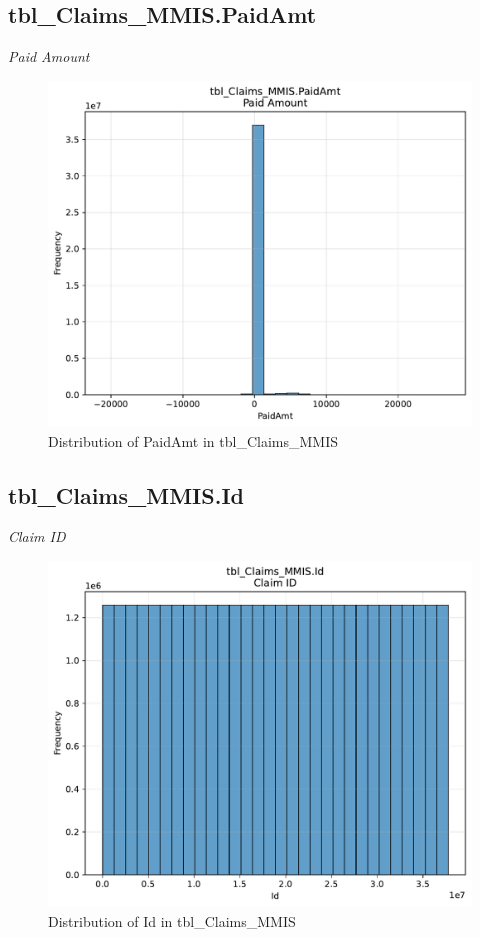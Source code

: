 \subsection{tbl\_Claims\_MMIS.PaidAmt}
\textit{Paid Amount}

\begin{figure}[htbp]
\centering
\includegraphics[width=\textwidth]{figures/dbo_tbl_Claims_MMIS_PaidAmt.pdf}
\caption{Distribution of PaidAmt in tbl\_Claims\_MMIS}
\end{figure}\newpage

\subsection{tbl\_Claims\_MMIS.Id}
\textit{Claim ID}

\begin{figure}[htbp]
\centering
\includegraphics[width=\textwidth]{figures/dbo_tbl_Claims_MMIS_Id.pdf}
\caption{Distribution of Id in tbl\_Claims\_MMIS}
\end{figure}\newpage

